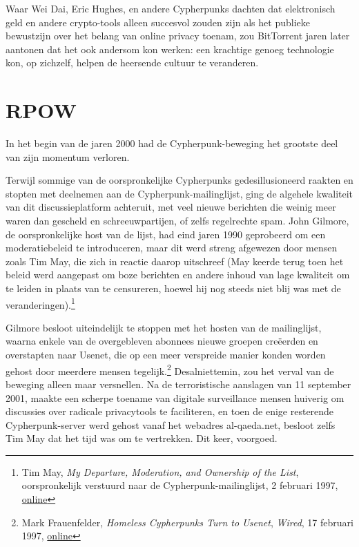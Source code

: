 \documentclass[
  a5paper,
  smalldemyvopaper,11pt,twoside,onecolumn,openright,extrafontsizes,
hidelinks]{memoir}
\begin{document}
Waar Wei Dai, Eric Hughes, en andere Cypherpunks dachten dat
elektronisch geld en andere crypto-tools alleen succesvol zouden zijn
als het publieke bewustzijn over het belang van online privacy toenam,
zou BitTorrent jaren later aantonen dat het ook andersom kon werken: een
krachtige genoeg technologie kon, op zichzelf, helpen de heersende
cultuur te veranderen.

\chapter{RPOW}\label{rpow}

In het begin van de jaren 2000 had de Cypherpunk-beweging het grootste
deel van zijn momentum verloren.

Terwijl sommige van de oorspronkelijke Cypherpunks gedesillusioneerd
raakten en stopten met deelnemen aan de Cypherpunk-mailinglijst, ging de
algehele kwaliteit van dit discussieplatform achteruit, met veel nieuwe
berichten die weinig meer waren dan gescheld en schreeuwpartijen, of
zelfs regelrechte spam. John Gilmore, de oorspronkelijke host van de
lijst, had eind jaren 1990 geprobeerd om een moderatiebeleid te
introduceren, maar dit werd streng afgewezen door mensen zoals Tim May,
die zich in reactie daarop uitschreef (May keerde terug toen het beleid
werd aangepast om boze berichten en andere inhoud van lage kwaliteit om
te leiden in plaats van te censureren, hoewel hij nog steeds niet blij
was met de veranderingen).\footnote{Tim May, \emph{My Departure,
  Moderation, and Ownership of the List}, oorspronkelijk verstuurd naar
  de Cypherpunk-mailinglijst, 2 februari 1997,
  \href{https://cypherpunks.venona.com/date/1997/02/msg02898.html}{online}}

Gilmore besloot uiteindelijk te stoppen met het hosten van de
mailinglijst, waarna enkele van de overgebleven abonnees nieuwe groepen
creëerden en overstapten naar Usenet, die op een meer verspreide manier
konden worden gehost door meerdere mensen tegelijk.\footnote{\hspace{0pt}Mark
  Frauenfelder, \emph{Homeless Cypherpunks Turn to Usenet},
  \emph{Wired}, 17 februari 1997,
  \href{https://www.wired.com/1997/02/homeless-cypherpunks-turn-to-usenet/}{online}}
Desalniettemin, zou het verval van de beweging alleen maar versnellen.
Na de terroristische aanslagen van 11 september 2001, maakte een scherpe
toename van digitale surveillance mensen huiverig om discussies over
radicale privacytools te faciliteren, en toen de enige resterende
Cypherpunk-server werd gehost vanaf het webadres al-qaeda.net, besloot
zelfs Tim May dat het tijd was om te vertrekken. Dit keer, voorgoed.
\end{document}
